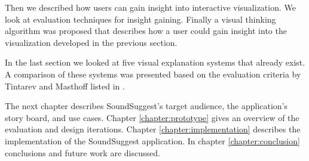 Then we described how users can gain insight into interactive visualization. We look at evaluation techniques for insight gaining. Finally a visual thinking algorithm was proposed that describes how a user could gain insight into the visualization developed in the previous section.

In the last section we looked at five visual explanation systems that already exist. A comparison of these systems was presented based on the evaluation criteria by Tintarev and Masthoff listed in \cite{tintarev:2007:SER:1547550.1547664}.

The next chapter describes SoundSuggest's target audience, the application's story board, and use cases. Chapter \ref{chapter:prototype} gives an overview of the evaluation and design iterations. Chapter \ref{chapter:implementation} describes the implementation of the SoundSuggest application. In chapter \ref{chapter:conclusion} conclusions and future work are discussed.





